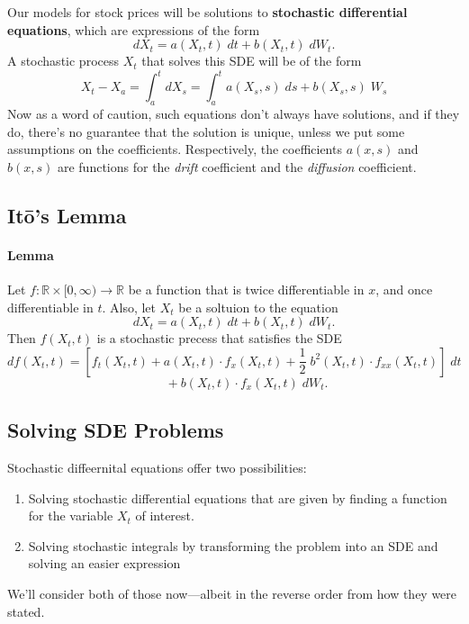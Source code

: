 \documentclass[12pt]{article}
\theoremstyle{plain}
\theoremstyle{definition}
\theoremstyle{remark}
\begin{document}
Our models for stock prices will be solutions to \textbf{stochastic
differential equations}, which are expressions of the form
\begin{equation}
   \label{sde}
   dX_t = a(X_t,t)\;dt + b(X_t,t)\;dW_t.
\end{equation}
A stochastic process $X_t$ that solves this SDE will be of the form
   \[ X_t - X_a = \int_a^t dX_s = \int_a^t a(X_s,s)\;ds + b(X_s,s)\;W_s
      \]
Now as a word of caution, such equations don't always have solutions, and
if they do, there's no guarantee that the solution is unique, unless
we put some assumptions on the coefficients.  Respectively, the
coefficients $a(x,s)$ and $b(x,s)$ are functions for the \emph{drift}
coefficient and the \emph{diffusion} coefficient.

\subsection{It\={o}'s Lemma}

\paragraph{Lemma} Let $f: \mathbb{R}\times [0,\infty) \rightarrow
\mathbb{R}$ be a function that is twice differentiable in $x$, and
once differentiable in $t$. Also, let $X_t$ be a soltuion to the equation
   \[ dX_t = a(X_t,t)\; dt + b(X_t,t)\; dW_t.\]
Then $f(X_t,t)$ is a stochastic precess that satisfies the SDE
   \[ df(X_t,t) = \left[f_t(X_t,t) + a(X_t,t) \cdot f_x(X_t,t)
      + \frac{1}{2}\; b^2(X_t,t)\cdot f_{xx}(X_t,t)\right]\;dt \]
   \[ \qquad + b(X_t,t)\cdot f_x(X_t,t)\;dW_t. \]

\subsection{Solving SDE Problems}

Stochastic diffeernital equations offer two possibilities:
   \begin{enumerate}
      \item{Solving stochastic differential equations that are given
	 by finding a function for the variable $X_t$ of interest.}
      \item{Solving stochastic integrals by transforming the problem
	 into an SDE and solving an easier expression}
   \end{enumerate}
We'll consider both of those now---albeit in the reverse order from
how they were stated.
\end{document}
